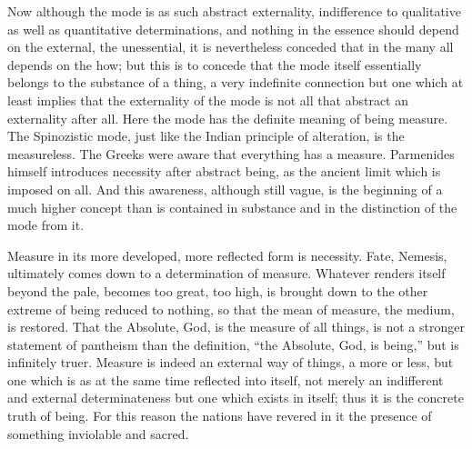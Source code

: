 Now although the mode is as such abstract externality, indifference
to qualitative as well as quantitative determinations, and nothing in the
essence should depend on the external, the unessential, it is nevertheless
conceded that in the many all depends on the how;
but this is to concede that the mode itself essentially belongs to
the substance of a thing, a very indefinite connection but
one which at least implies that the externality of
the mode is not all that abstract an externality after all.
Here the mode has the definite meaning of being measure.
The Spinozistic mode, just like the Indian principle of alteration,
is the measureless.
The Greeks were aware that everything has a measure.
Parmenides himself introduces necessity after abstract being,
as the ancient limit which is imposed on all.
And this awareness, although still vague, is the beginning of a much
higher concept than is contained in substance and
in the distinction of the mode from it.

Measure in its more developed, more reflected form is necessity.
Fate, Nemesis, ultimately comes down to a determination of measure.
Whatever renders itself beyond the pale, becomes too great, too high,
is brought down to the other extreme of being reduced to nothing,
so that the mean of measure, the medium, is restored.
That the Absolute, God, is the measure of all things, is not
a stronger statement of pantheism than the definition,
“the Absolute, God, is being,” but is infinitely truer.
Measure is indeed an external way of things, a more or less,
but one which is as at the same time reflected into itself,
not merely an indifferent and external determinateness
but one which exists in itself; thus it is the concrete truth of being.
For this reason the nations have revered in it the presence of
something inviolable and sacred.

